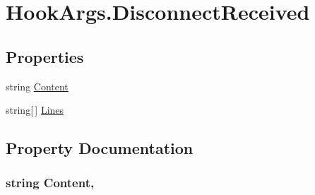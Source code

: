 \hypertarget{structOTA_1_1Plugin_1_1HookArgs_1_1DisconnectReceived}{}\section{Hook\+Args.\+Disconnect\+Received}
\label{structOTA_1_1Plugin_1_1HookArgs_1_1DisconnectReceived}
\subsection*{Properties}
\begin{DoxyCompactItemize}
\item 
string \hyperlink{structOTA_1_1Plugin_1_1HookArgs_1_1DisconnectReceived_a6d1fb265b40351e94f79e0f749e5daf9}{Content}
\item 
string\mbox{[}$\,$\mbox{]} \hyperlink{structOTA_1_1Plugin_1_1HookArgs_1_1DisconnectReceived_a35ecc63f81998013f2813b6f27480609}{Lines}
\end{DoxyCompactItemize}


\subsection{Property Documentation}
\hypertarget{structOTA_1_1Plugin_1_1HookArgs_1_1DisconnectReceived_a6d1fb265b40351e94f79e0f749e5daf9}{}
\subsubsection[{Content}]{\setlength{\rightskip}{0pt plus 5cm}string Content\hspace{0.3cm}{\ttfamily [get]}, {\ttfamily [set]}}\label{structOTA_1_1Plugin_1_1HookArgs_1_1DisconnectReceived_a6d1fb265b40351e94f79e0f749e5daf9}
\hypertarget{structOTA_1_1Plugin_1_1HookArgs_1_1DisconnectReceived_a35ecc63f81998013f2813b6f27480609}{}
